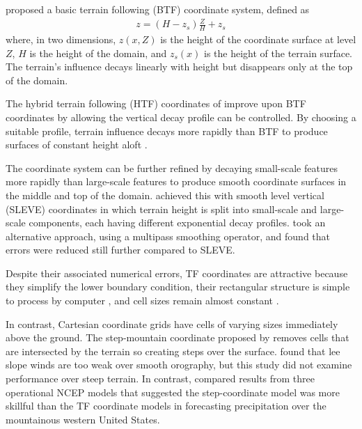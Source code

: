 \textcite{galchen-somerville1975} proposed a basic terrain following (BTF) coordinate system, defined as
\begin{align}
z = \left( H - z_s \right) \frac{Z}{H} + z_s
\end{align}
where, in two dimensions, $z(x, Z)$ is the height of the coordinate surface at level $Z$, $H$ is the height of the domain, and $z_s(x)$ is the height of the terrain surface.     The terrain's influence decays linearly with height but disappears only at the top of the domain.

The hybrid terrain following (HTF) coordinates of \textcite{simmons-burridge1981} improve upon BTF coordinates by allowing the vertical decay profile can be controlled.  By choosing a suitable profile, terrain influence decays more rapidly than BTF to produce surfaces of constant height aloft \autocite{klemp2011}.

The coordinate system can be further refined by decaying small-scale features more rapidly than large-scale features to produce smooth coordinate surfaces in the middle and top of the domain.  \textcite{schaer2002} achieved this with smooth level vertical (SLEVE) coordinates in which terrain height is split into small-scale and large-scale components, each having different exponential decay profiles.    \textcite{klemp2011} took an alternative approach, using a multipass smoothing operator, and found that errors were reduced still further compared to SLEVE.


Despite their associated numerical errors, TF coordinates are attractive because they simplify the lower boundary condition, their rectangular structure is simple to process by computer \autocite{schaer2002}, and cell sizes remain almost constant \autocite{jebens2011}.

In contrast, Cartesian coordinate grids have cells of varying sizes immediately above the ground.  The step-mountain coordinate proposed by \textcite{mesinger1988} removes cells that are intersected by the terrain so creating steps over the surface.    \textcite{gallus-klemp2000} found that lee slope winds are too weak over smooth orography, but this study did not examine performance over steep terrain.  In contrast, \textcite{mesinger2004} compared results from three operational NCEP models that suggested the step-coordinate model was more skillful than the TF coordinate models in forecasting precipitation over the mountainous western United States.

